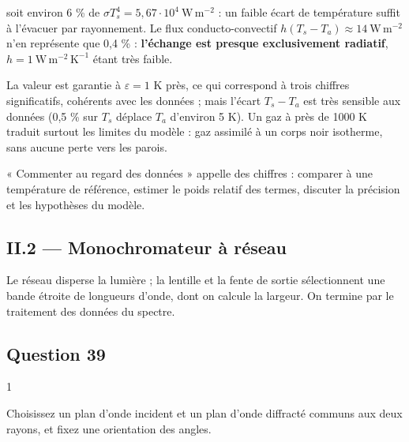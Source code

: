 \documentclass[11pt,a4paper]{article}
\newcommand{\equationajustee}[1]{%
  \sbox{\boiteequation}{$\displaystyle #1$}%
  \ifdim\wd\boiteequation>\linewidth
    \[\resizebox{\linewidth}{!}{\usebox{\boiteequation}}\]%
  \else
    \[#1\]%
  \fi}
\begin{document}
\equationajustee{\begin{aligned}
\frac{4I^2}{\gamma\pi^2D^3} &= \frac{4\times625}{10^7\times\pi^2\times8\cdot10^{-9}} \\
&\approx 3{,}2\cdot10^3\ \mathrm{W\,m^{-2}}
\end{aligned}}

soit environ 6 \% de \(\sigma T_s^4 = 5{,}67\cdot10^4\ \mathrm{W\,m^{-2}}\) : un faible écart de température suffit à l'évacuer par rayonnement. Le flux conducto-convectif \(h(T_s - T_a) \approx 14\ \mathrm{W\,m^{-2}}\) n'en représente que 0,4 \% : \textbf{l'échange est presque exclusivement radiatif}, \(h = 1\ \mathrm{W\,m^{-2}\,K^{-1}}\) étant très faible.

La valeur est garantie à \(\varepsilon = 1\) K près, ce qui correspond à trois chiffres significatifs, cohérents avec les données ; mais l'écart \(T_s - T_a\) est très sensible aux données (0,5 \% sur \(T_s\) déplace \(T_a\) d'environ 5 K). Un gaz à près de 1000 K traduit surtout les limites du modèle : gaz assimilé à un corps noir isotherme, sans aucune perte vers les parois.

\begin{methode}

« Commenter au regard des données » appelle des chiffres : comparer à une température de référence, estimer le poids relatif des termes, discuter la précision et les hypothèses du modèle.

\end{methode}

\hypertarget{ii.2-monochromateur-uxe0-ruxe9seau}{%
\subsection{II.2 --- Monochromateur à réseau}\label{ii.2-monochromateur-uxe0-ruxe9seau}}

Le réseau disperse la lumière ; la lentille et la fente de sortie sélectionnent une bande étroite de longueurs d'onde, dont on calcule la largeur. On termine par le traitement des données du spectre.

\hypertarget{question-39}{%
\subsection{Question 39}\label{question-39}}

\begin{indication}{1}

Choisissez un plan d'onde incident et un plan d'onde diffracté communs aux deux rayons, et fixez une orientation des angles.

\end{indication}
\end{document}
